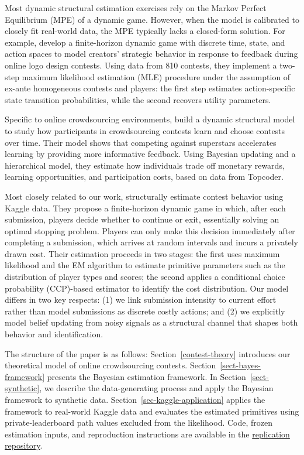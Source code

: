 \documentclass[mnsc]{informs3}
\begin{document}
Most dynamic structural estimation exercises rely on the Markov Perfect Equilibrium (MPE) of a dynamic game.
However, when the model is calibrated to closely fit real-world data, the MPE typically lacks a closed-form solution.
For example, \citet{jiang2022feedback} develop a finite-horizon dynamic game with discrete time, state, and action spaces to model creators’ strategic behavior in response to feedback during online logo design contests.
Using data from 810 contests, they implement a two-step maximum likelihood estimation (MLE) procedure under the assumption of ex-ante homogeneous contests and players: the first step estimates action-specific state transition probabilities, while the second recovers utility parameters.

Specific to online crowdsourcing environments,
\citet{zhang2019structural} build a dynamic structural model to study how participants in crowdsourcing contests learn and choose contests over time.
Their model shows that competing against superstars accelerates learning by providing more informative feedback.
Using Bayesian updating and a hierarchical model, they estimate how individuals trade off monetary rewards, learning opportunities, and participation costs, based on data from Topcoder.

Most closely related to our work, \citet{lemus2021dynamic} structurally estimate contest behavior using Kaggle data.
They propose a finite-horizon dynamic game in which, after each submission, players decide whether to continue or exit, essentially solving an optimal stopping problem.
Players can only make this decision immediately after completing a submission, which arrives at random intervals and incurs a privately drawn cost.
Their estimation proceeds in two stages: the first uses maximum likelihood and the EM algorithm to estimate primitive parameters such as the distribution of player types and scores; the second applies a conditional choice probability (CCP)-based estimator to identify the cost distribution.
Our model differs in two key respects:
(1) we link submission intensity to current effort rather than model submissions as discrete costly actions; and
(2) we explicitly model belief updating from noisy signals as a structural channel that shapes both behavior and identification.







The structure of the paper is as follows:
Section~\ref{contest-theory} introduces our theoretical model of online crowdsourcing contests.
Section~\ref{sect-bayes-framework} presents the Bayesian estimation framework.
In Section~\ref{sect-synthetic}, we describe the data-generating process and apply the Bayesian framework to synthetic data.
Section~\ref{sec-kaggle-application} applies the framework to real-world Kaggle data and evaluates the estimated primitives using private-leaderboard path values excluded from the likelihood.
{Code, frozen estimation inputs, and reproduction instructions are available in the \href{https://github.com/zhuanglinsheng/kaggle-contest-design}{replication repository}.}
\end{document}
